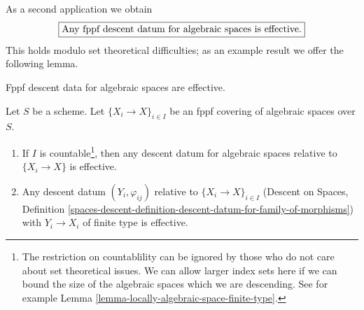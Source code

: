 \noindent
As a second application we obtain
$$
\fbox{Any fppf descent datum for algebraic spaces is effective.}
$$
This holds modulo set theoretical difficulties; as an example result
we offer the following lemma.

\begin{lemma}
\label{lemma-descend-algebraic-space}
\begin{slogan}
Fppf descent data for algebraic spaces are effective.
\end{slogan}
Let $S$ be a scheme. Let $\{X_i \to X\}_{i \in I}$ be an fppf
covering of algebraic spaces over $S$.
\begin{enumerate}
\item If $I$ is countable\footnote{The restriction on countablility can be
ignored by those who do not care about set theoretical issues. We can allow
larger index sets here if we can bound the size of the algebraic spaces
which we are descending. See for example
Lemma \ref{lemma-locally-algebraic-space-finite-type}.}, then any
descent datum for algebraic spaces relative to $\{X_i \to X\}$ is effective.
\item Any descent datum $(Y_i, \varphi_{ij})$ relative to
$\{X_i \to X\}_{i \in I}$ (Descent on Spaces, Definition
\ref{spaces-descent-definition-descent-datum-for-family-of-morphisms})
with $Y_i \to X_i$ of finite type
is effective.
\end{enumerate}
\end{lemma}


